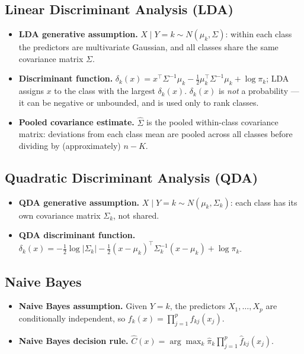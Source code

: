 \documentclass[11pt]{article}
\begin{document}
\subsection{Linear Discriminant Analysis (LDA)}
\begin{keydefbox}
\begin{itemize}
\item \textbf{LDA generative assumption.} $X\mid Y=k \sim N(\mu_k,\Sigma)$: within each class the predictors are multivariate Gaussian, and all classes share the same covariance matrix $\Sigma$.
\item \textbf{Discriminant function.} $\delta_k(x) = x^\top\Sigma^{-1}\mu_k - \tfrac12\mu_k^\top\Sigma^{-1}\mu_k+\log\pi_k$; LDA assigns $x$ to the class with the largest $\delta_k(x)$. $\delta_k(x)$ is \emph{not} a probability --- it can be negative or unbounded, and is used only to rank classes.
\item \textbf{Pooled covariance estimate.} $\hat\Sigma$ is the pooled within-class covariance matrix: deviations from each class mean are pooled across all classes before dividing by (approximately) $n-K$.
\end{itemize}
\end{keydefbox}

\subsection{Quadratic Discriminant Analysis (QDA)}
\begin{keydefbox}
\begin{itemize}
\item \textbf{QDA generative assumption.} $X\mid Y=k \sim N(\mu_k,\Sigma_k)$: each class has its own covariance matrix $\Sigma_k$, not shared.
\item \textbf{QDA discriminant function.} $\delta_k(x) = -\tfrac12\log|\Sigma_k| - \tfrac12(x-\mu_k)^\top\Sigma_k^{-1}(x-\mu_k)+\log\pi_k$.
\end{itemize}
\end{keydefbox}

\subsection{Naive Bayes}
\begin{keydefbox}
\begin{itemize}
\item \textbf{Naive Bayes assumption.} Given $Y=k$, the predictors $X_1,\dots,X_p$ are conditionally independent, so $f_k(x) = \prod_{j=1}^p f_{kj}(x_j)$.
\item \textbf{Naive Bayes decision rule.} $\hat C(x) = \arg\max_k \hat\pi_k \prod_{j=1}^p \hat f_{kj}(x_j)$.
\end{itemize}
\end{keydefbox}
\end{document}
